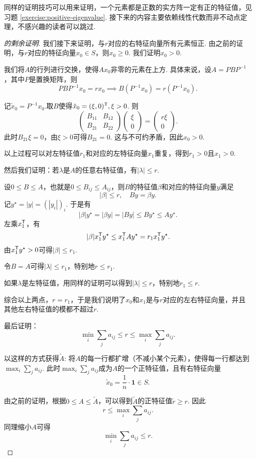 同样的证明技巧可以用来证明，一个元素都是正数的实方阵一定有正的特征值，见习题 \ref{exercise:positive-eigenvalue}. 接下来的内容主要依赖线性代数而非不动点定理，不感兴趣的读者可以跳过.

\begin{proof}[ 的剩余证明]
我们接下来证明，与$r$对应的右特征向量所有元素恒正. 由之前的证明，与$r$对应的特征向量$x_0\in S$，则$x_0\geq 0$. 我们证明$x_0>0$.

我们将$A$的行列进行交换，使得$Ax_0$非零的元素在上方. 具体来说，设$A = PBP^{-1}$，其中$P$是置换矩阵，则
\[PBP^{-1}x_0=rx_0\implies B(P^{-1}x_0)=r(P^{-1}x_0).\]

记$\tilde{x}_0 = P^{-1}x_0$.取$B$使得$\tilde{x}_0 = (\xi,0)^{\mathsf{T}}, \xi > 0$. 则
\[
\begin{pmatrix}
    B_{11} & B_{12}\\
    B_{21} & B_{22}
\end{pmatrix}
\begin{pmatrix}
    \xi\\
    0
\end{pmatrix}=
\begin{pmatrix}
    r\xi\\
    0
\end{pmatrix}.
\]
此时$B_{21}\xi=0$，由$\xi>0$可得$B_{21}=0$. 这与不可约矛盾，因此$x_0 > 0$.

以上过程可以对左特征值$r_1$和对应的左特征向量$x_1$重复，得到$r_1>0$且$x_1>0$.

然后我们证明：若$\lambda$是$A$的任意右特征值，有$|\lambda|\leq r$. 

设$0\leq B\leq A$，也就是$0\leq B_{ij}\leq A_{ij}$，则$B$的特征值$\beta$和对应的特征向量$y$满足
\[|\beta|\leq r,\quad By=\beta y.\]
记$y^\star = |y|=(|y_i|)_i$. 于是有
\[|\beta|y^\star = |\beta y| = |By| \leq By^\star\leq Ay^\star.\]
左乘$x_1^{\mathsf{T}}$，有
\[|\beta|x_1^{\mathsf{T}} y^\star \leq x_1^{\mathsf{T}} Ay^\star = r_1x_1^{\mathsf{T}} y^\star.\]
由$x_1^{\mathsf{T}} y^\star>0$可得$|\beta|\leq r_1$. 

令$B=A$可得$|\lambda|\leq r_1$，特别地$r\leq r_1$. 

如果$\lambda$是左特征值，用同样的证明可以得到$|\lambda|\leq r$，特别地$r_1\leq r$. 

综合以上两点，$r=r_1$，于是我们说明了$x_0$和$x_1$是与$r$对应的左右特征向量，并且其他左右特征值的模都不超过$r$. 

最后证明：
\[\min_i\sum_j a_{ij}\leq r\leq \max_i\sum_j a_{ij}.\]

以这样的方式获得$\tilde A$: 将$A$的每一行都扩增（不减小某个元素），使得每一行都达到$\max_i\sum_j a_{ij}$. 此时$\max_i\sum_j a_{ij}$成为$A$的一个正特征值，且有右特征向量
\[\tilde{x}_0=\frac 1n\cdot\mathbf{1}\in S.\] 

由之前的证明，根据$0\leq A\leq \tilde A$，可以得到$\tilde A$的正特征值$\tilde r\geq r$. 因此
\[r \leq \max_i\sum_j a_{ij}.\]
同理缩小$A$可得
\[\min_i\sum_j a_{ij}\leq r.\]
\end{proof}


